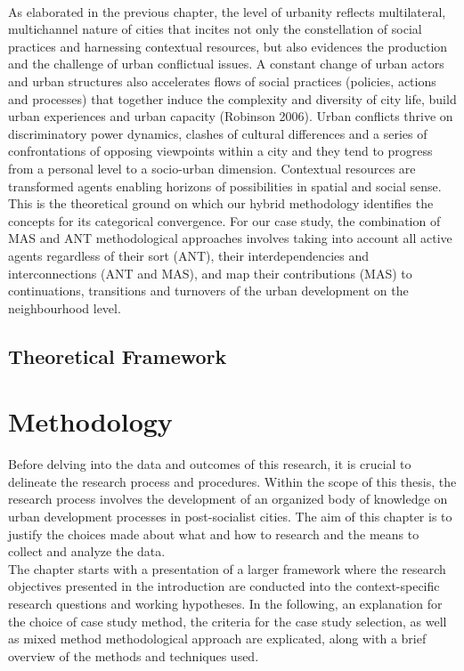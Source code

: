 \documentclass[11pt]{report}
\begin{document}
\\ 
As elaborated in the previous chapter, the level of urbanity reflects multilateral, multichannel  nature of cities that incites not only the constellation of social practices and harnessing contextual resources, but also evidences the production and the challenge of urban conflictual issues. A constant change of urban actors and urban structures also accelerates flows of social practices (policies, actions and processes) that together induce the complexity and diversity of city life, build urban experiences and urban capacity (Robinson 2006). Urban conflicts thrive on discriminatory power dynamics, clashes of cultural differences and a series of confrontations of opposing viewpoints within a city and they tend to progress from a personal level to a socio-urban dimension. Contextual resources are transformed agents enabling horizons of possibilities in spatial and social sense.
\\
This is the theoretical ground on which our hybrid methodology identifies the concepts for its categorical convergence. For our case study, the combination of MAS and ANT methodological approaches involves taking into account all active agents regardless of their sort (ANT), their interdependencies and interconnections (ANT and MAS), and map their contributions (MAS) to continuations, transitions and turnovers of the urban development on the neighbourhood level.

\section{Theoretical Framework}



\chapter{Methodology}

Before delving into the data  and outcomes of this research, it is crucial to delineate the research process and procedures. Within the scope of this thesis, the research process involves the development of an organized body of knowledge on urban development processes in post-socialist cities. The aim of this chapter is to justify the choices made about what and how to research and the means to collect and analyze the data.
\\
The chapter starts with a presentation of a larger framework where the research objectives presented in the introduction are conducted into the context-specific research questions and working hypotheses. In the following, an explanation for the choice of case study method, the criteria for the case study selection, as well as mixed method methodological approach are explicated, along with a brief overview of the methods and techniques used.  
\end{document}

